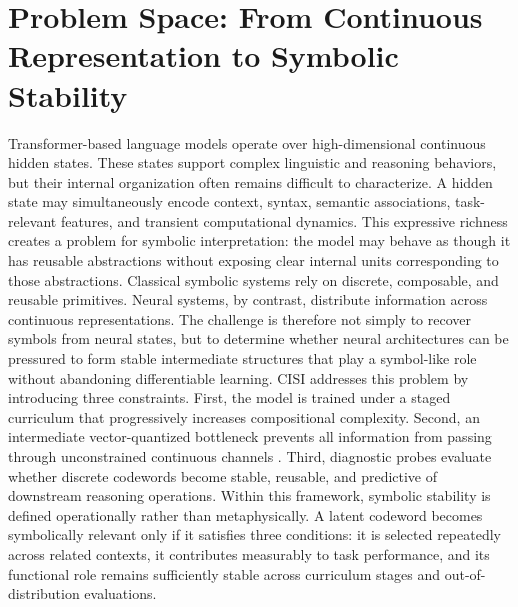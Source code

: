 \section{Problem Space: From Continuous Representation to Symbolic Stability}
Transformer-based language models operate over high-dimensional continuous hidden states. These states support complex linguistic and reasoning behaviors, but their internal organization often remains difficult to characterize. A hidden state may simultaneously encode context, syntax, semantic associations, task-relevant features, and transient computational dynamics. This expressive richness creates a problem for symbolic interpretation: the model may behave as though it has reusable abstractions without exposing clear internal units corresponding to those abstractions.
Classical symbolic systems rely on discrete, composable, and reusable primitives. Neural systems, by contrast, distribute information across continuous representations. The challenge is therefore not simply to recover symbols from neural states, but to determine whether neural architectures can be pressured to form stable intermediate structures that play a symbol-like role without abandoning differentiable learning.
CISI addresses this problem by introducing three constraints. First, the model is trained under a staged curriculum that progressively increases compositional complexity. Second, an intermediate vector-quantized bottleneck prevents all information from passing through unconstrained continuous channels \cite{VanDenOord2017}. Third, diagnostic probes evaluate whether discrete codewords become stable, reusable, and predictive of downstream reasoning operations.
Within this framework, symbolic stability is defined operationally rather than metaphysically. A latent codeword becomes symbolically relevant only if it satisfies three conditions: it is selected repeatedly across related contexts, it contributes measurably to task performance, and its functional role remains sufficiently stable across curriculum stages and out-of-distribution evaluations.
